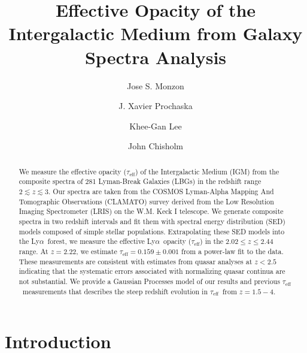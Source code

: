 \documentclass[twocolumn,tight,times]{aastex63}
\newcommand{\mteff}{\tau_\mathrm{eff}}
\newcommand{\teff}{$\mteff$}
\newcommand{\lya}{Ly$\alpha$}
\newcommand{\Aval}{0.159}  %
\newcommand{\Aerr}{0.001}  %
\begin{document}
\title{Effective Opacity of the Intergalactic Medium from Galaxy Spectra Analysis}


\author[0000-0002-9986-4604]{Jose S. Monzon}

\author[0000-0002-7738-6875]{J. Xavier Prochaska}

\author[0000-0001-9299-5719]{Khee-Gan Lee}

\author[0000-0002-0302-2577]{John Chisholm}

\begin{abstract}

We measure the effective opacity (\teff) of the Intergalactic Medium (IGM) from the composite spectra of 281 Lyman-Break Galaxies (LBGs) in the redshift range $2 \lesssim z \lesssim 3$. Our spectra are taken from the COSMOS Lyman-Alpha Mapping And Tomographic Observations (CLAMATO) survey derived from the Low Resolution Imaging Spectrometer (LRIS) on the W.M. Keck I telescope. We generate composite spectra in two redshift intervals and fit them with spectral energy distribution (SED) models composed of simple stellar populations. Extrapolating these SED models into the \lya\ forest, we measure the effective \lya\ opacity (\teff) in the $2.02 \leq z \leq 2.44$ range. At $z = 2.22$, we estimate $\mteff = \Aval \pm \Aerr$ from a power-law fit to the data. These measurements are consistent with estimates from quasar analyses at $z<2.5$ indicating that the systematic errors associated with normalizing quasar continua are not substantial. We provide a Gaussian Processes model of our results and previous \teff\ measurements that describes the steep redshift evolution in \teff\ from $z = 1.5 - 4$.

\end{abstract}


\section{Introduction}
\label{sec:intro}
\end{document}
